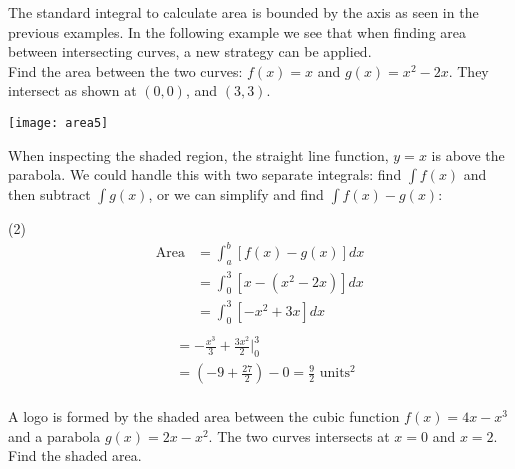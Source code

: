 The standard integral to calculate area is bounded by the axis as seen in the previous examples. In the following example we see that when finding area between intersecting curves, a new strategy can be applied. \medskip\\

\example Find the area between the two curves: $f(x)=x$ and $g(x)=x^2-2x$. They intersect as shown at $(0,0)$, and $(3,3)$.
\begin{center}\texttt{[image: area5]}\end{center}
\solution When inspecting the shaded region, the straight line function, $y=x$ is above the parabola. We could handle this with two separate integrals: find $\int f(x)$ and then subtract $\int g(x)$, or we can simplify and find $\int f(x)-g(x)$:
\begin{tasks}[label-offset=-5em](2)
\task[]\begin{align*}
\text{Area}&=\int_a^b[f(x)-g(x)]dx\\
&=\int_0^3[x-(x^2-2x)]dx\\
&=\int_0^3[-x^2+3x]dx\\
\end{align*}
\task[]\begin{align*}
&=-\frac{x^3}{3}+\frac{3x^2}{2}\Big\vert_0^3\\
&=\left(-9+\frac{27}{2}\right)-0=\frac{9}{2}\text{ units}^2\\
\end{align*}
\end{tasks}
\clearpage
\example A logo is formed by the shaded area between the cubic function  $ f(x)=4x -x^3$ and a parabola $g(x)=2x-x^2$. The two curves intersects at $x=0$ and $x=2$. Find the shaded area.\\
